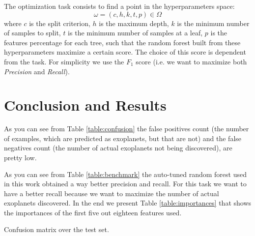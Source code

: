 \documentclass[11pt, a4paper]{article}
\begin{document}
  The optimization task consists to find a point in the hyperparameters space:
  \[\omega=(c, h, k, t, p)\in\Omega\]
  where $c$ is the split criterion, $h$ is the maximum depth, $k$ is the minimum number of samples to split, $t$ is the minimum number of samples at a leaf, $p$ is the features percentage for each tree, such that the random forest built from these hyperparameters maximize a certain score. The choice of this score is dependent from the task. For simplicity we use the $F_{1}$ score (i.e. we want to maximize both \textit{Precision} and \textit{Recall}).

\section{Conclusion and Results}
  As you can see from Table \ref{table:confusion} the false positives count (the number of examples, which are predicted as exoplanets, but that are not) and the false negatives count (the number of actual exoplanets not being discovered), are pretty low.

  As you can see from Table \ref{table:benchmark} the auto-tuned random forest used in this work obtained a way better precision and recall. For this task we want to have a better recall because we want to maximize the number of actual exoplanets discovered.
  In the end we present Table \ref{table:importances} that shows the importances of the first five out eighteen features used.
  
  \begin{table}
    \centering
    \caption{Confusion matrix over the test set.}
    \label{table:confusion}
  \end{table}
\end{document}
